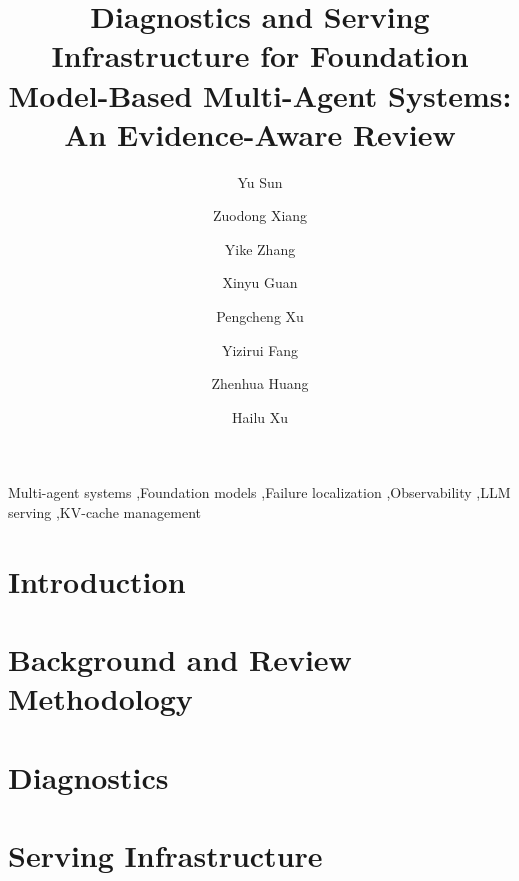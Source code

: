 \documentclass[preprint,12pt]{elsarticle}
\begin{document}
\begin{frontmatter}
\title{Diagnostics and Serving Infrastructure for Foundation Model-Based Multi-Agent Systems: An Evidence-Aware Review}
\author[upenn]{Yu Sun}
\author[ucd]{Zuodong Xiang}
\author[jhu]{Yike Zhang}
\author[glasgow]{Xinyu Guan}
\author[uci]{Pengcheng Xu}
\author[jhu]{Yizirui Fang}
\author[scnu]{Zhenhua Huang}
\author[csulb]{Hailu Xu}
\address[upenn]{School of Engineering and Applied Science, University of Pennsylvania, Philadelphia, PA, United States}
\address[ucd]{Department of Electrical and Computer Engineering, University of California, Davis, Davis, CA, United States}
\address[jhu]{Department of Computer Science, Whiting School of Engineering, Johns Hopkins University, Baltimore, MD, United States}
\address[glasgow]{University of Glasgow, Glasgow, Scotland, United Kingdom}
\address[uci]{Department of Computer Science, University of California, Irvine, Irvine, CA, United States}
\address[scnu]{School of Computer Science, South China Normal University, Guangzhou, Guangdong, China}
\address[csulb]{Department of Computer Engineering and Computer Science, California State University, Long Beach, Long Beach, CA, United States}
\begin{abstract}

\end{abstract}
\begin{keyword}
Multi-agent systems \sep Foundation models \sep Failure localization \sep Observability \sep LLM serving \sep KV-cache management
\end{keyword}
\end{frontmatter}

\section{Introduction}\label{sec:introduction}

\section{Background and Review Methodology}\label{sec:background}

\section{Diagnostics}\label{sec:diagnostics}

\section{Serving Infrastructure}\label{sec:infrastructure}

\end{document}
